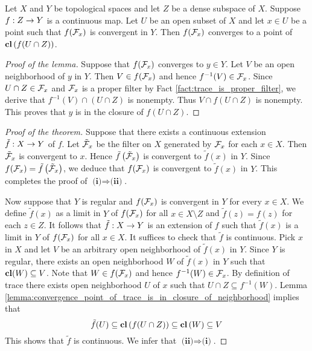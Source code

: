 \documentclass[10pt]{amsart}
\begin{document}
\begin{lemma}\label{lemma:convergence_point_of_trace_is_in_closure_of_neighborhood}
	Let $X$ and $Y$ be topological spaces and let $Z$ be a dense subspace of $X$. Suppose $f:Z\rightarrow Y$ is a continuous map. Let $U$ be an open subset of $X$ and let $x \in U$ be a point such that $f({\mathcal F}_x)$ is convergent in $Y$. Then $f({\mathcal F}_x)$ converges to a point of $\mathbf{cl}\left(f(U\cap Z)\right)$.
\end{lemma}
\begin{proof}[Proof of the lemma]
	Suppose that $f({\mathcal F}_x)$ converges to $y \in Y$. Let $V$ be an open neighborhood of $y$ in $Y$. Then $V \in f({\mathcal F}_x)$ and hence $f^{-1}(V) \in {\mathcal F}_x$. Since $U\cap Z \in {\mathcal F}_x$ and ${\mathcal F}_x$ is a proper filter by Fact \ref{fact:trace_is_proper_filter}, we derive that $f^{-1}(V)\cap \left(U\cap Z\right)$ is nonempty. Thus $V\cap f(U\cap Z)$ is nonempty. This proves that $y$ is in the closure of $f(U\cap Z)$.
\end{proof}

\begin{proof}[Proof of the theorem]
	Suppose that there exists a continuous extension $\tilde{f}:X\rightarrow Y$ of $f$. Let $\tilde{{\mathcal F}}_x$ be the filter on $X$ generated by ${\mathcal F}_x$ for each $x \in X$. Then $\tilde{{\mathcal F}}_x$ is convergent to $x$. Hence $\tilde{f}\left(\tilde{{\mathcal F}}_x\right)$ is convergent to $\tilde{f}(x)$ in $Y$. Since $f({\mathcal F}_x) = \tilde{f}\left(\tilde{{\mathcal F}}_x\right)$, we deduce that $f({\mathcal F}_x)$ is convergent to $\tilde{f}(x)$ in $Y$. This completes the proof of $\textbf{(i)}\Rightarrow \textbf{(ii)}$.

	Now suppose that $Y$ is regular and $f({\mathcal F}_x)$ is convergent in $Y$ for every $x \in X$. We define $\tilde{f}(x)$ as a limit in $Y$ of $f({\mathcal F}_x)$ for all $x \in X\setminus Z$ and $\tilde{f}(z) = f(z)$ for each $z \in Z$. It follows that $\tilde{f}:X\rightarrow Y$ is an extension of $f$ such that $\tilde{f}(x)$ is a limit in $Y$ of $f({\mathcal F}_x)$ for all $x \in X$. It suffices to check that $\tilde{f}$ is continuous. Pick $x$ in $X$ and let $V$ be an arbitrary open neighborhood of $\tilde{f}(x)$ in $Y$. Since $Y$ is regular, there exists an open neighborhood $W$ of $\tilde{f}(x)$ in $Y$ such that $\mathbf{cl}(W) \subseteq V$. Note that $W \in f({\mathcal F}_x)$ and hence $f^{-1}(W) \in {\mathcal F}_x$. By definition of trace there exists open neighborhood $U$ of $x$ such that $U\cap Z \subseteq f^{-1}(W)$. Lemma \ref{lemma:convergence_point_of_trace_is_in_closure_of_neighborhood} implies that 
	$$\tilde{f}(U) \subseteq \mathbf{cl}\left(f(U\cap Z)\right) \subseteq \mathbf{cl}\left(W\right) \subseteq V$$
	This shows that $\tilde{f}$ is continuous. We infer that $\textbf{(ii)}\Rightarrow \textbf{(i)}$.
\end{proof}




\small


\end{document}
